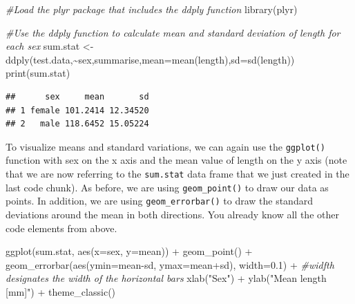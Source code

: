 \documentclass[
]{book}
\newenvironment{Shaded}{\begin{snugshade}}{\end{snugshade}}
\newcommand{\AttributeTok}[1]{\textcolor[rgb]{0.77,0.63,0.00}{#1}}
\newcommand{\CommentTok}[1]{\textcolor[rgb]{0.56,0.35,0.01}{\textit{#1}}}
\newcommand{\FloatTok}[1]{\textcolor[rgb]{0.00,0.00,0.81}{#1}}
\newcommand{\FunctionTok}[1]{\textcolor[rgb]{0.00,0.00,0.00}{#1}}
\newcommand{\NormalTok}[1]{#1}
\newcommand{\OtherTok}[1]{\textcolor[rgb]{0.56,0.35,0.01}{#1}}
\newcommand{\SpecialCharTok}[1]{\textcolor[rgb]{0.00,0.00,0.00}{#1}}
\newcommand{\StringTok}[1]{\textcolor[rgb]{0.31,0.60,0.02}{#1}}
\begin{document}
\begin{Shaded}
\begin{Highlighting}[]
\CommentTok{\#Load the plyr package that includes the ddply function}
\FunctionTok{library}\NormalTok{(plyr)}

\CommentTok{\#Use the ddply function to calculate mean and standard deviation of length for each sex}
\NormalTok{sum.stat }\OtherTok{\textless{}{-}} \FunctionTok{ddply}\NormalTok{(test.data,}\SpecialCharTok{\textasciitilde{}}\NormalTok{sex,summarise,}\AttributeTok{mean=}\FunctionTok{mean}\NormalTok{(length),}\AttributeTok{sd=}\FunctionTok{sd}\NormalTok{(length))}
\FunctionTok{print}\NormalTok{(sum.stat)}
\end{Highlighting}
\end{Shaded}

\begin{verbatim}
##      sex     mean       sd
## 1 female 101.2414 12.34520
## 2   male 118.6452 15.05224
\end{verbatim}

To visualize means and standard variations, we can again use the \texttt{ggplot()} function with sex on the x axis and the mean value of length on the y axis (note that we are now referring to the \texttt{sum.stat} data frame that we just created in the last code chunk). As before, we are using \texttt{geom\_point()} to draw our data as points. In addition, we are using \texttt{geom\_errorbar()} to draw the standard deviations around the mean in both directions. You already know all the other code elements from above.

\begin{Shaded}
\begin{Highlighting}[]
\FunctionTok{ggplot}\NormalTok{(sum.stat, }\FunctionTok{aes}\NormalTok{(}\AttributeTok{x=}\NormalTok{sex, }\AttributeTok{y=}\NormalTok{mean)) }\SpecialCharTok{+}
  \FunctionTok{geom\_point}\NormalTok{() }\SpecialCharTok{+}
  \FunctionTok{geom\_errorbar}\NormalTok{(}\FunctionTok{aes}\NormalTok{(}\AttributeTok{ymin=}\NormalTok{mean}\SpecialCharTok{{-}}\NormalTok{sd, }\AttributeTok{ymax=}\NormalTok{mean}\SpecialCharTok{+}\NormalTok{sd), }\AttributeTok{width=}\FloatTok{0.1}\NormalTok{)  }\SpecialCharTok{+}  \CommentTok{\#widfth designates the width of the horizontal bars}
  \FunctionTok{xlab}\NormalTok{(}\StringTok{"Sex"}\NormalTok{) }\SpecialCharTok{+}
  \FunctionTok{ylab}\NormalTok{(}\StringTok{"Mean length [mm]"}\NormalTok{) }\SpecialCharTok{+}
  \FunctionTok{theme\_classic}\NormalTok{()}
\end{Highlighting}
\end{Shaded}
\end{document}
